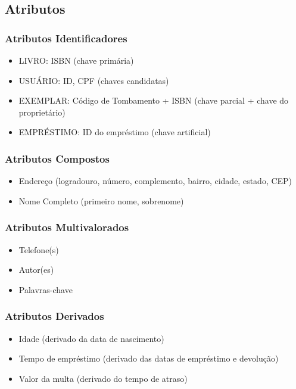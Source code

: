 \documentclass[12pt,a4paper]{article}
\begin{document}
\subsection{Atributos}
\begin{tcolorbox}[title=Tipos de Atributos]

\subsubsection{Atributos Identificadores}
\begin{itemize}
    \item LIVRO: ISBN (chave primária)
    \item USUÁRIO: ID, CPF (chaves candidatas)
    \item EXEMPLAR: Código de Tombamento + ISBN (chave parcial + chave do proprietário)
    \item EMPRÉSTIMO: ID do empréstimo (chave artificial)
\end{itemize}

\subsubsection{Atributos Compostos}
\begin{itemize}
    \item Endereço (logradouro, número, complemento, bairro, cidade, estado, CEP)
    \item Nome Completo (primeiro nome, sobrenome)
\end{itemize}

\subsubsection{Atributos Multivalorados}
\begin{itemize}
    \item Telefone(s)
    \item Autor(es)
    \item Palavras-chave
\end{itemize}

\subsubsection{Atributos Derivados}
\begin{itemize}
    \item Idade (derivado da data de nascimento)
    \item Tempo de empréstimo (derivado das datas de empréstimo e devolução)
    \item Valor da multa (derivado do tempo de atraso)
\end{itemize}
\end{tcolorbox}
\end{document}
